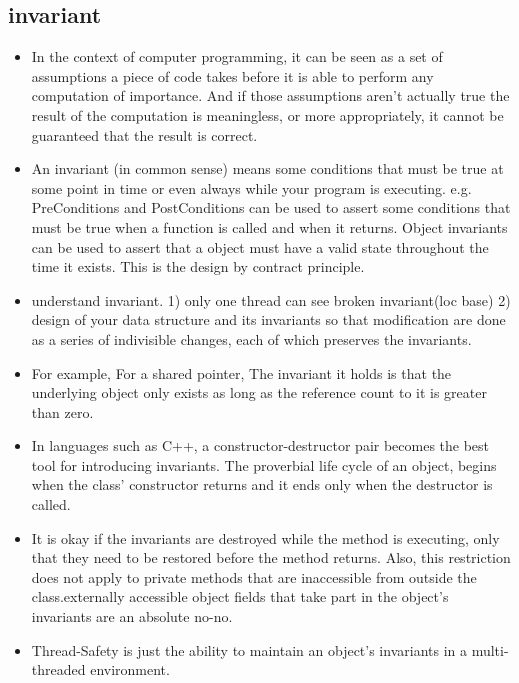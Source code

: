 \documentclass[a4paper,11pt,twoside]{book}
\begin{document}
\subsection{invariant}
\begin{itemize}
	\item In the context of computer programming, it can be seen as a set of assumptions a piece of code takes before it is able to perform any computation of importance. And if those assumptions aren’t actually true the result of the computation is meaningless, or more appropriately, it cannot be guaranteed that the result is correct. 
	
	\item An invariant (in common sense) means some conditions that must be true at some point in time or even always while your program is executing. e.g. PreConditions and PostConditions can be used to assert some conditions that must be true when a function is called and when it returns. Object invariants can be used to assert that a object must have a valid state throughout the time it exists. This is the design by contract principle.
	
	\item understand invariant. 1) only one thread can see broken invariant(loc base) 2) design of your data structure and its invariants so that modification are done as a series of indivisible changes, each of which preserves the invariants. 
	
	
	\item For example, For a shared pointer, The invariant it holds is that the underlying object only exists as long as the reference count to it is greater than zero.
	
	\item In languages such as C++, a constructor-destructor pair becomes the best tool for introducing invariants. The proverbial life cycle of an object, begins when the class’ constructor returns and it ends only when the destructor is called.
	
	\item It is okay if the invariants are destroyed while the method is executing, only that they need to be restored before the method returns. Also, this restriction does not apply to private methods that are inaccessible from outside the class.externally accessible object fields that take part in the object’s invariants are an absolute no-no.
	
	\item Thread-Safety is just the ability to maintain an object’s invariants in a multi-threaded environment.
	

\end{itemize}
\end{document}
